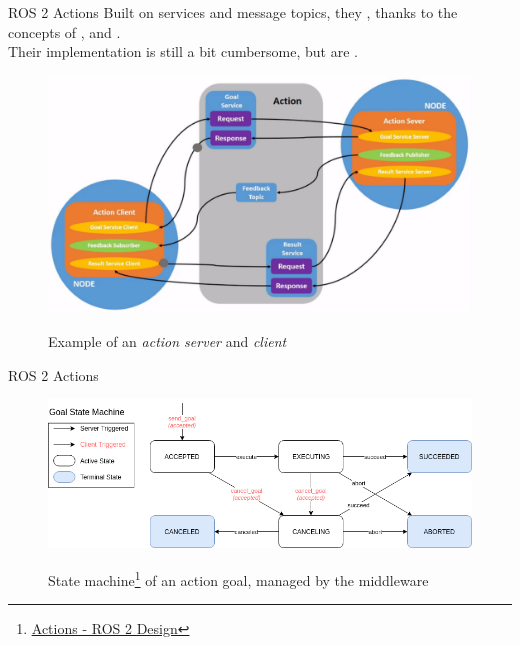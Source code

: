 \begin{frame}{ROS 2 Actions}
Built on services and message topics, they , thanks to the concepts of ,  and .\\
Their implementation is still a bit cumbersome, but are .
\begin{figure}
  \centering
  \includegraphics[scale=.31]{ros2Act.png}
  \label{fig:ros2Act}
  \caption{Example of an \emph{action server} and \emph{client}}
\end{figure}
\end{frame}
\begin{frame}{ROS 2 Actions}
\begin{figure}
  \centering
  \includegraphics[width=\textwidth]{goalStateMachine.png}
  \label{fig:goalStateMachine}
  \caption{State machine\footnote{\href{http://design.ros2.org/articles/actions.html}{\color{blue}\underline{Actions - ROS 2 Design}}} of an action goal, managed by the middleware}
\end{figure}
\end{frame}
